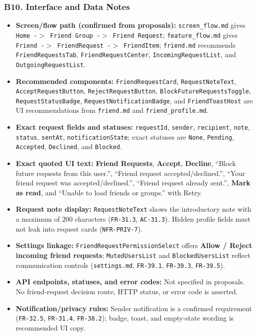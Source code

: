 \documentclass[12pt]{article}
\begin{document}
\hypertarget{sec:b10-interface-and-data-notes}{}
\subsubsection*{B10. Interface and Data Notes}
\par\medskip

\begin{itemize}
\item \textbf{Screen/flow path (confirmed from proposals):} \texttt{screen\_flow.md} gives \texttt{Home -$>$ Friend Group -$>$ Friend Request}; \texttt{feature\_flow.md} gives \texttt{Friend -$>$ FriendRequest -$>$ FriendItem}; \texttt{friend.md} recommends \texttt{FriendRequestsTab}, \texttt{FriendRequestCenter}, \texttt{IncomingRequestList}, and \texttt{OutgoingRequestList}.
\item \textbf{Recommended components:} \texttt{FriendRequestCard}, \texttt{RequestNoteText}, \texttt{AcceptRequestButton}, \texttt{RejectRequestButton}, \texttt{BlockFutureRequestsToggle}, \texttt{RequestStatusBadge}, \texttt{RequestNotificationBadge}, and \texttt{FriendToastHost} are UI recommendations from \texttt{friend.md} and \texttt{friend\_profile.md}.
\item \textbf{Exact request fields and statuses:} \texttt{requestId}, \texttt{sender}, \texttt{recipient}, \texttt{note}, \texttt{status}, \texttt{sentAt}, \texttt{notificationState}; exact statuses are \texttt{None}, \texttt{Pending}, \texttt{Accepted}, \texttt{Declined}, and \texttt{Blocked}.
\item \textbf{Exact quoted UI text:} \textbf{Friend Requests}, \textbf{Accept}, \textbf{Decline}, “Block future requests from this user.”, “Friend request accepted/declined.”, “Your friend request was accepted/declined.”, “Friend request already sent.”, \textbf{Mark as read}, and “Unable to load friends or groups.” with Retry.
\item \textbf{Request note display:} \texttt{RequestNoteText} shows the introductory note with a maximum of 200 characters (\texttt{FR-31.3}, \texttt{AC-31.3}). Hidden profile fields must not leak into request cards (\texttt{NFR-PRIV-7}).
\item \textbf{Settings linkage:} \texttt{FriendRequestPermissionSelect} offers \textbf{Allow / Reject incoming friend requests}; \texttt{MutedUsersList} and \texttt{BlockedUsersList} reflect communication controls (\texttt{settings.md}, \texttt{FR-39.1}, \texttt{FR-39.3}, \texttt{FR-39.5}).
\item \textbf{API endpoints, statuses, and error codes:} Not specified in proposals. No friend-request decision route, HTTP status, or error code is asserted.
\item \textbf{Notification/privacy rules:} Sender notification is a confirmed requirement (\texttt{FR-32.5}, \texttt{FR-31.4}, \texttt{FR-38.2}); badge, toast, and empty-state wording is recommended UI copy.
\end{itemize}
\par\medskip
\end{document}
